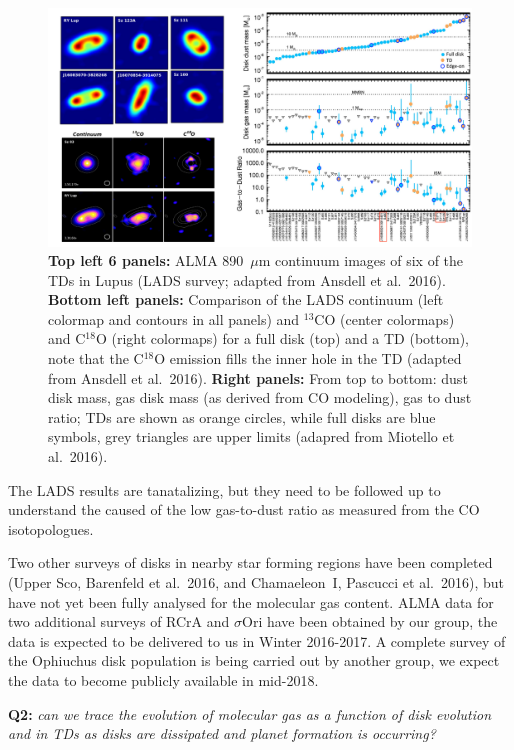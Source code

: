 \documentclass[10pt,fleqn,twoside]{article}
\begin{document}
\begin{figure}
\includegraphics[scale=0.45]{Figure_Lupus_TDs.pdf}
\caption{{\bf Top left 6 panels:} ALMA 890~$\mu$m continuum images of six of the TDs in Lupus (LADS survey; adapted from Ansdell et al.~2016). {\bf Bottom left panels:} Comparison of the LADS continuum (left colormap and contours in all panels) and $^{13}$CO (center colormaps) and C$^{18}$O (right colormaps) for a full disk (top) and a TD (bottom), note that the C$^{18}$O emission fills the inner hole in the TD (adapted from Ansdell et al.~2016). {\bf Right panels:} From top to bottom: dust disk mass, gas disk mass (as derived from CO modeling), gas to dust ratio; TDs are shown as orange circles, while full disks are blue symbols, grey triangles are upper limits (adapred from Miotello et al.~2016).}
\label{f_LADS}
\end{figure}

The LADS results are tanatalizing, but they need to be followed up to understand the caused of the low gas-to-dust ratio as measured from the CO isotopologues.

Two other surveys of disks in nearby star forming regions have been completed (Upper Sco, Barenfeld et al.~2016, and Chamaeleon~I, Pascucci et al.~2016), but have not yet been fully analysed for the molecular gas content. ALMA data for two additional surveys of RCrA and $\sigma$Ori have been obtained by our group, the data is expected to be delivered to us in Winter 2016-2017. A complete survey of the Ophiuchus disk population is being carried out by another group, we expect the data to become publicly available in mid-2018.

\smallskip
{\bf Q2:} {\it can we trace the evolution of molecular gas as a function of disk evolution and in TDs as disks are dissipated and planet formation is occurring?}
\end{document}
